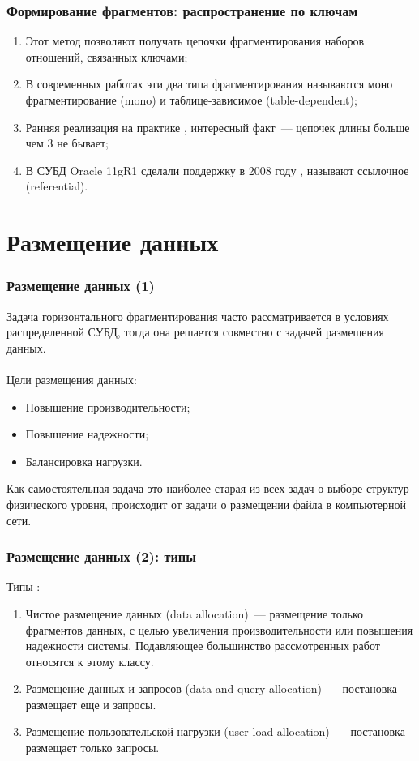 \documentclass[unicode]{beamer}
\begin{document}
\begin{frame}
\frametitle{Формирование фрагментов: распространение по ключам}

\begin{enumerate}
  \setlength\itemsep{1em}	
  \item Этот метод позволяют получать цепочки фрагментирования наборов отношений, связанных ключами;
  \item В современных работах \cite{p16} эти два типа фрагментирования называются моно фрагментирование (mono) и таблице-зависимое (table-dependent);
  \item Ранняя реализация на практике \cite{p42}, интересный факт~--- цепочек длины больше чем 3 не бывает;
  \item В СУБД Oracle 11gR1 сделали поддержку в 2008 году \cite{p27}, называют ссылочное (referential).
\end{enumerate}

\end{frame}

\section{Размещение данных}

\begin{frame}
\frametitle{Размещение данных (1)}

Задача горизонтального фрагментирования часто рассматривается в условиях распределенной СУБД, тогда она решается совместно с задачей размещения данных.
\\~\\
Цели размещения данных:
\begin{itemize}
  \setlength\itemsep{1em}	
  \item Повышение производительности;
  \item Повышение надежности;
  \item Балансировка нагрузки.
\end{itemize}

Как самостоятельная задача это наиболее старая из всех задач о выборе структур физического уровня, происходит от задачи о размещении файла в компьютерной сети.

\end{frame}


\begin{frame}
\frametitle{Размещение данных (2): типы}

Типы \cite{p28}:
\begin{enumerate}
  \setlength\itemsep{1em}	
  \item Чистое размещение данных (data allocation)~--- размещение только фрагментов данных, с целью увеличения производительности или повышения надежности системы. Подавляющее большинство рассмотренных работ относятся к этому классу.
  \item Размещение данных и запросов (data and query allocation)~--- постановка размещает еще и запросы. 
  \item Размещение пользовательской нагрузки (user load allocation)~--- постановка размещает только запросы.
\end{enumerate}

\end{frame}
\end{document}
